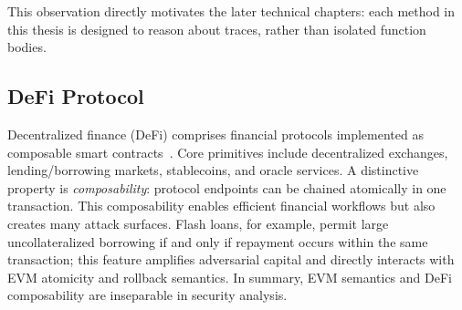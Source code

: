 This observation directly motivates the later
technical chapters: each method in this thesis is
designed to reason about traces, rather than
isolated function bodies.

\subsection{DeFi Protocol}
Decentralized finance (DeFi) comprises
financial protocols implemented as composable
smart contracts~\cite{wust2018you}. Core primitives
include decentralized exchanges,
lending/borrowing markets, stablecoins, and oracle services.
A distinctive property is \emph{composability}:
protocol endpoints can be chained atomically
in one transaction.
This composability enables efficient financial
workflows but also creates many attack
surfaces. Flash loans, for example, permit
large uncollateralized borrowing if and only
if repayment occurs within the same transaction;
this feature amplifies adversarial capital
and directly interacts with EVM atomicity and
rollback semantics.
In summary, EVM semantics and DeFi composability
are inseparable in security analysis.
